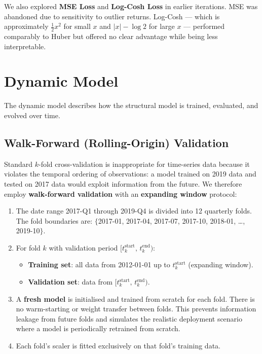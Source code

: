 We also explored \textbf{MSE Loss} and \textbf{Log-Cosh Loss} in earlier
iterations.  MSE was abandoned due to sensitivity to outlier returns.
Log-Cosh --- which is approximately $\frac{1}{2}x^2$ for small $x$ and
$|x| - \log 2$ for large $x$ --- performed comparably to Huber but offered
no clear advantage while being less interpretable.

\section{Dynamic Model}
\label{sec:dynamic-model}

The dynamic model describes how the structural model is trained, evaluated,
and evolved over time.

\subsection{Walk-Forward (Rolling-Origin) Validation}
\label{sec:walk-forward}

Standard $k$-fold cross-validation is inappropriate for time-series data because
it violates the temporal ordering of observations: a model trained on 2019 data
and tested on 2017 data would exploit information from the future.  We therefore
employ \textbf{walk-forward validation} with an \textbf{expanding window}
protocol:

\begin{enumerate}
  \item The date range 2017-Q1 through 2019-Q4 is divided into 12 quarterly
        folds.  The fold boundaries are:
        $\{$2017-01, 2017-04, 2017-07, 2017-10, 2018-01, \ldots, 2019-10$\}$.

  \item For fold $k$ with validation period $[t_k^{\text{start}},\,
        t_k^{\text{end}})$:
        \begin{itemize}
          \item \textbf{Training set}: all data from 2012-01-01 up to
                $t_k^{\text{start}}$ (expanding window).
          \item \textbf{Validation set}: data from
                $[t_k^{\text{start}},\, t_k^{\text{end}})$.
        \end{itemize}

  \item A \textbf{fresh model} is initialised and trained from scratch for each
        fold.  There is no warm-starting or weight transfer between folds.  This
        prevents information leakage from future folds and simulates the
        realistic deployment scenario where a model is periodically retrained
        from scratch.

  \item Each fold's scaler is fitted exclusively on that fold's training data.
\end{enumerate}

